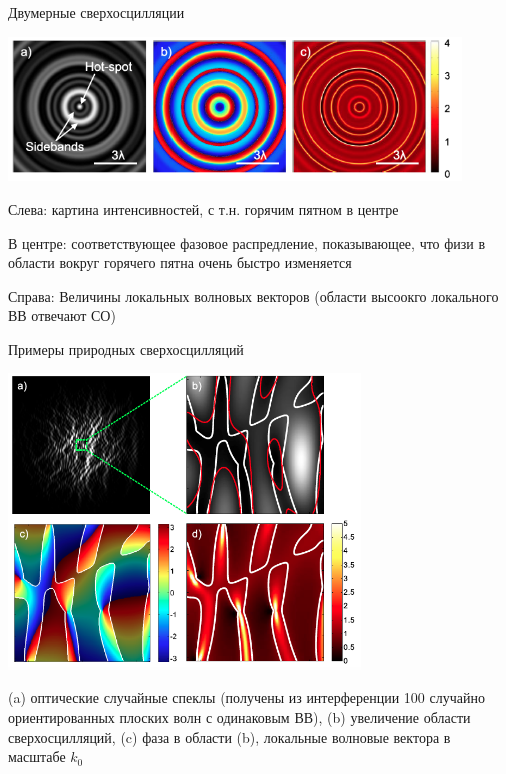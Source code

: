 \documentclass[9pt, compress, xcolor=table]{beamer}
\begin{document}
\begin{frame}{Двумерные сверхосцилляции}
\begin{center}
\includegraphics[width=0.9\textwidth]{nh5}
\end{center}

Слева: картина интенсивностей, с т.н. горячим пятном в центре

В центре: соответствующее фазовое распредление, показывающее, что физи в области вокруг горячего пятна очень быстро изменяется

Справа: Величины локальных волновых векторов (области высоокго локального ВВ отвечают СО)

\end{frame}

\begin{frame}{Примеры природных сверхосцилляций}
\begin{center}
\includegraphics[width=0.7\textwidth]{nh6}

{\small (a) оптические случайные спеклы (получены из интерференции 100 случайно ориентированных плоских волн с одинаковым ВВ), (b) увеличение области сверхосцилляций, (c) фаза в области (b), локальные волновые вектора в масштабе $k_0$}
\end{center}
\end{frame}
\end{document}
